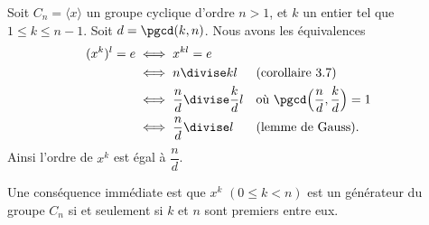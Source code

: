 Soit $C_n=\langle x \rangle$ un groupe cyclique d'ordre $n>1$, et $k$ un entier
tel que $1\leqslant k\leqslant n-1$. Soit $d = \pgcd(k,n)$. Nous avons les
équivalences
%
\begin{align*}
  (x^k)^l = e
  &\iff x^{kl} = e \\
  &\iff n \divise kl && \text{(corollaire 3.7)} \\
  &\iff \frac{n}{d} \divise \frac{k}{d}l
    && \text{où $\pgcd\Bigl(\frac{n}{d},\frac{k}{d}\Bigr) = 1$}\\
  &\iff \frac{n}{d} \divise l && \text{(lemme de Gauss).}
\end{align*}
%
Ainsi l'ordre de $x^k$ est égal à $\dfrac{n}{d}$.

\begin{remarque}
  Une conséquence immédiate est que $x^k$ $(0\leq k<n)$ est un générateur du
  groupe $C_n$ si et seulement si $k$ et $n$ sont premiers entre eux.
\end{remarque}

